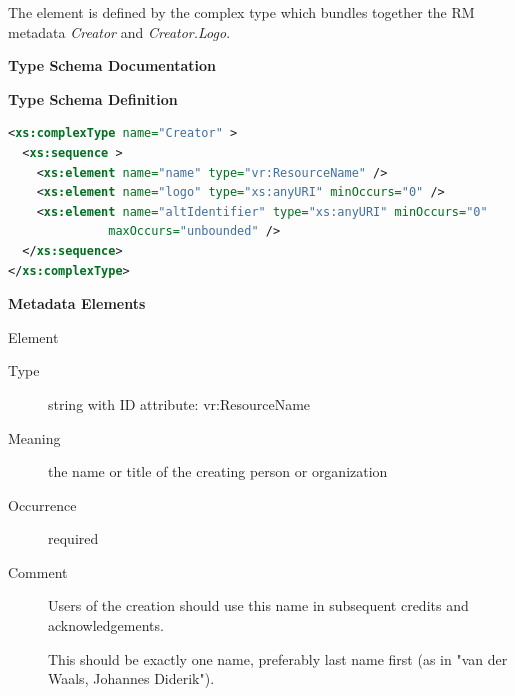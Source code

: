 \documentclass[11pt,a4paper]{ivoa}
\begin{document}


The  element is defined by the  complex
type which bundles together the RM metadata \emph{Creator} and
\emph{Creator.Logo}.



\begin{generated}
\begingroup
      	\renewcommand*\descriptionlabel[1]{%
      	\hbox to 5.5em{\emph{#1}\hfil}}\vspace{2ex}\noindent\textbf{ Type Schema Documentation}


\vspace{1ex}\noindent\textbf{ Type Schema Definition}

\begin{lstlisting}[language=XML,basicstyle=\footnotesize]
<xs:complexType name="Creator" >
  <xs:sequence >
    <xs:element name="name" type="vr:ResourceName" />
    <xs:element name="logo" type="xs:anyURI" minOccurs="0" />
    <xs:element name="altIdentifier" type="xs:anyURI" minOccurs="0"
              maxOccurs="unbounded" />
  </xs:sequence>
</xs:complexType>
\end{lstlisting}

\vspace{0.5ex}\noindent\textbf{ Metadata Elements}

\begingroup\small\begin{bigdescription}\item[Element \xmlel{name}]
\begin{description}
\item[Type] string with ID attribute: vr:ResourceName
\item[Meaning] 
                  the name or title of the creating person or organization
              
\item[Occurrence] required
\item[Comment] 
                  Users of the creation should use this name in
                  subsequent credits and acknowledgements.

                  This should be exactly one name, preferably last name
                  first (as in {"}van der Waals, Johannes Diderik{"}).
              


\end{description}
\end{bigdescription}
\end{generated}
\end{document}
